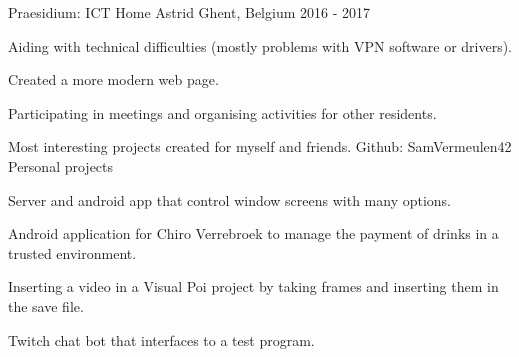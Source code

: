 


\begin{cventries}


\cventry
{Praesidium: ICT} %
{Home Astrid} %
{Ghent, Belgium} %
{2016 - 2017} %
{ %
\begin{cvitems}
\item {Aiding with technical difficulties (mostly problems with VPN software or drivers).}
\item {Created a more modern web page.}
\item {Participating in meetings and organising activities for other residents.}
\end{cvitems}
}


\cventry
{Most interesting projects created for myself and friends. Github: SamVermeulen42}
{Personal projects}
{}
{}
{ %
\begin{cvitems}
\item {Server and android app that control window screens with many options.}
\item {Android application for Chiro Verrebroek to manage the payment of drinks in a trusted environment.}
\item {Inserting a video in a Visual Poi project by taking frames and inserting them in the save file.}
\item {Twitch chat bot that interfaces to a test program.}
\end{cvitems}
}


\end{cventries}